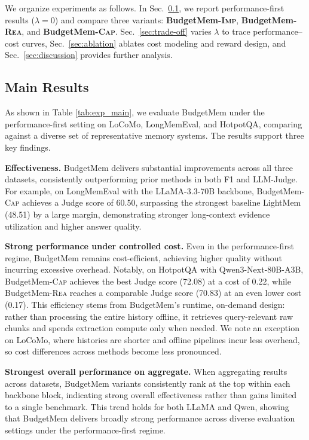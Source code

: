 We organize experiments as follows. In Sec.~\ref{sec:main_results}, we report performance-first results ($\lambda=0$) and compare three variants: \textbf{BudgetMem-\textsc{Imp}}, \textbf{BudgetMem-\textsc{Rea}}, and \textbf{BudgetMem-\textsc{Cap}}. Sec.~\ref{sec:trade-off} varies $\lambda$ to trace performance--cost curves, Sec.~\ref{sec:ablation} ablates cost modeling and reward design, and Sec.~\ref{sec:discussion} provides further analysis.





\subsection{Main Results}
\label{sec:main_results}


As shown in Table \ref{tab:exp_main}, we evaluate BudgetMem under the performance-first setting on LoCoMo, LongMemEval, and HotpotQA, comparing against a diverse set of representative memory systems. The results support three key findings.

\textbf{Effectiveness.} BudgetMem delivers substantial improvements across all three datasets, consistently outperforming prior methods in both F1 and LLM-Judge. For example, on LongMemEval with the LLaMA-3.3-70B backbone, BudgetMem-\textsc{Cap} achieves a Judge score of 60.50, surpassing the strongest baseline LightMem (48.51) by a large margin, demonstrating stronger long-context evidence utilization and higher answer quality.



\textbf{Strong performance under controlled cost.} Even in the performance-first regime, BudgetMem remains cost-efficient, achieving higher quality without incurring excessive overhead. Notably, on HotpotQA with Qwen3-Next-80B-A3B, BudgetMem-\textsc{Cap} achieves the best Judge score (72.08) at a cost of 0.22, while BudgetMem-\textsc{Rea} reaches a comparable Judge score (70.83) at an even lower cost (0.17). This efficiency stems from BudgetMem's runtime, on-demand design: rather than processing the entire history offline, it retrieves query-relevant raw chunks and spends extraction compute only when needed. We note an exception on LoCoMo, where histories are shorter and offline pipelines incur less overhead, so cost differences across methods become less pronounced.


\textbf{Strongest overall performance on aggregate.}
When aggregating results across datasets, BudgetMem variants consistently rank at the top within each backbone block, indicating strong overall effectiveness rather than gains limited to a single benchmark. This trend holds for both LLaMA and Qwen, showing that BudgetMem delivers broadly strong performance across diverse evaluation settings under the performance-first regime.






